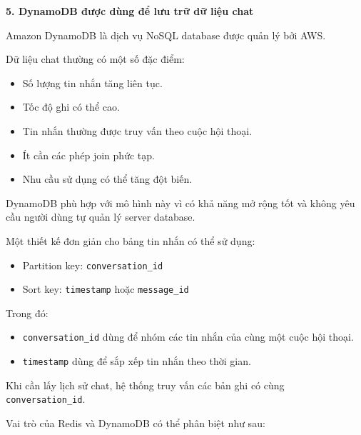 \vspace{0.5em}\noindent\textbf{5. DynamoDB được dùng để lưu trữ dữ liệu
chat}\par

Amazon DynamoDB là dịch vụ NoSQL database được quản lý bởi AWS.

Dữ liệu chat thường có một số đặc điểm:

\begin{itemize}
\tightlist
\item
  Số lượng tin nhắn tăng liên tục.
\item
  Tốc độ ghi có thể cao.
\item
  Tin nhắn thường được truy vấn theo cuộc hội thoại.
\item
  Ít cần các phép join phức tạp.
\item
  Nhu cầu sử dụng có thể tăng đột biến.
\end{itemize}

DynamoDB phù hợp với mô hình này vì có khả năng mở rộng tốt và không yêu
cầu người dùng tự quản lý server database.

Một thiết kế đơn giản cho bảng tin nhắn có thể sử dụng:

\begin{itemize}
\tightlist
\item
  Partition key: \texttt{conversation\_\allowbreak{}id}
\item
  Sort key: \texttt{timestamp} hoặc \texttt{message\_\allowbreak{}id}
\end{itemize}

Trong đó:

\begin{itemize}
\tightlist
\item
  \texttt{conversation\_\allowbreak{}id} dùng để nhóm các tin nhắn của cùng một cuộc
  hội thoại.
\item
  \texttt{timestamp} dùng để sắp xếp tin nhắn theo thời gian.
\end{itemize}

Khi cần lấy lịch sử chat, hệ thống truy vấn các bản ghi có cùng
\texttt{conversation\_\allowbreak{}id}.

Vai trò của Redis và DynamoDB có thể phân biệt như sau:

\begin{Shaded}
\begin{Highlighting}[]

\end{Highlighting}
\end{Shaded}

